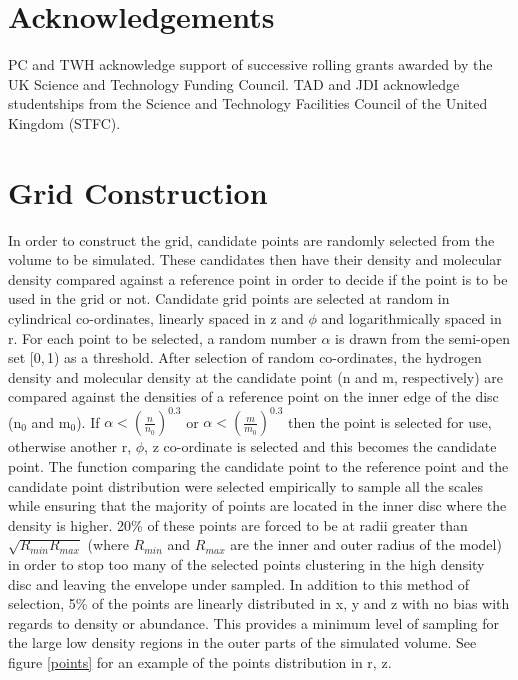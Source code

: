 \documentclass[useAMS,usenatbib]{mn2e}
\begin{document}
\section*{Acknowledgements}
PC and TWH acknowledge support of successive rolling grants awarded by the UK Science and Technology Funding Council. 
TAD and JDI acknowledge studentships from the Science and Technology Facilities Council of the United Kingdom (STFC).

\newpage

\appendix

\section{Grid Construction} \label{sec:gridding} 

In order to construct the grid, candidate points are randomly selected from the volume to be simulated. These candidates then have their density and molecular density compared against a reference point in order to decide if the point is to be used in the grid or not. Candidate grid points are selected at random in cylindrical co-ordinates, linearly spaced in z and $\phi$ and logarithmically spaced in r. For each point to be selected, a random number $\alpha$ is drawn from the semi-open set [0,$\,$1) as a threshold. After selection of random co-ordinates, the hydrogen density and molecular density at the candidate point (n and m, respectively) are compared against the densities of a reference point on the inner edge of the disc (n$_0$ and m$_0$). If $\alpha<\left( \frac{n}{n_0} \right)^{0.3}$ or $\alpha< \left( \frac{m}{m_0} \right)^{0.3}$ then the point is selected for use, otherwise another r, $\phi$, z co-ordinate is selected and this becomes the candidate point. The function comparing the candidate point to the reference point and the candidate point distribution were selected empirically to sample all the scales while ensuring that the majority of points are located in the inner disc where the density is higher. 20\% of these points are forced to be at radii greater than $\sqrt{R_{min}R_{max}}$ (where $R_{min}$ and $R_{max}$ are the inner and outer radius of the model) in order to stop too many of the selected points clustering in the high density disc and leaving the envelope under sampled. In addition to this method of selection, 5\% of the points are linearly distributed in x, y and z with no bias with regards to density or abundance. This provides a minimum level of sampling for the large low density regions in the outer parts of the simulated volume. See figure \ref{points} for an example of the points distribution in r, z. \newline
\end{document}
